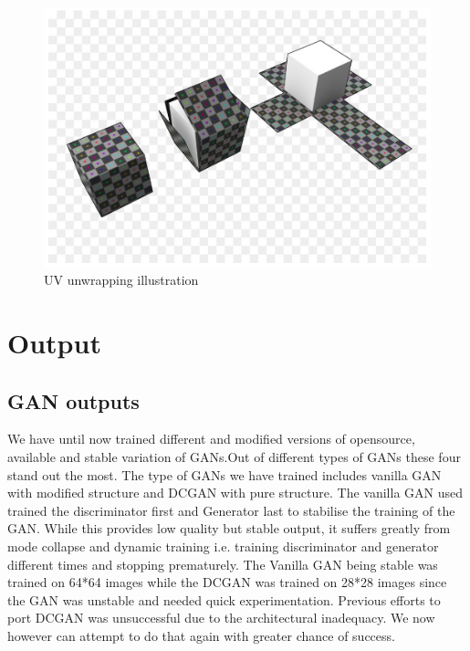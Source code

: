 \documentclass{article}
\begin{document}
\begin{figure}[H]
    \centering
    \includegraphics[width=15cm]{images/UVUnwrapping.png}
    \caption{UV unwrapping illustration}
    \label{fig:my_label}
\end{figure}


    
\newpage    
\section{Output}

\subsection{GAN outputs}

We have until now trained different and modified versions of opensource, available and stable variation of GANs.Out of different types of GANs these four stand out the most. The type of GANs we have trained includes vanilla GAN with modified structure and DCGAN with pure structure. The vanilla GAN used trained the discriminator first and Generator last to stabilise the training of the GAN. While this provides low quality but stable output, it suffers greatly from mode collapse and dynamic training i.e. training discriminator and generator different times and stopping prematurely. The Vanilla GAN being stable was trained on 64*64 images while the DCGAN was trained on 28*28 images since the GAN was unstable and needed quick experimentation. Previous efforts to port DCGAN was unsuccessful due to the architectural inadequacy. We now however can attempt to do that again with greater chance of success.
\end{document}
